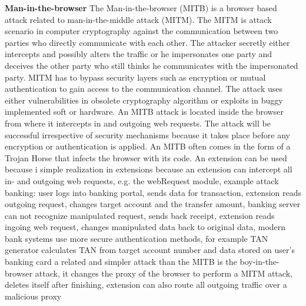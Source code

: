 \documentclass[article,colorback,accentcolor=tud9c,type=bsc]{tudthesis}
\begin{document}
	\textbf{Man-in-the-browser} \cite{Curran:2012:MBA:2433195.2433198} The Man-in-the-browser (MITB) is a browser based attack related to man-in-the-middle attack (MITM). The MITM is attack scenario in computer cryptography against the communication between two parties who directly communicate with each other. The attacker secretly either intercepts and possibly alters the traffic or he impersonates one party and deceives the other party who still thinks he communicates with the impersonated party. MITM has to bypass security layers such as encryption or mutual authentication to gain access to the communication channel. The attack uses either vulnerabilities in obsolete cryptography algorithm or exploits in buggy implemented soft or hardware. An MITB attack is located inside the browser from where it intercepts in and outgoing web requests. The attack will be successful irrespective of security mechanisms because it takes place before any encryption or authentication is applied. An MITB often comes in the form of a Trojan Horse that infects the browser with its code. An extension can be used because i %
	simple realization in extensions because an extension can intercept all in- and outgoing web requests, e.g. the webRequest module,   
	example attack banking: user logs into banking portal, sends data for transaction, extension reads outgoing request, changes target account and the transfer amount, banking server can not recognize manipulated request, sends back receipt, extension reads ingoing web request, changes manipulated data back to original data, modern bank systems use more secure authentication methods, for example TAN generator calculates TAN from target account number and data stored on user's banking card
	a related and simpler attack than the MITB is the boy-in-the-browser attack, it changes the proxy of the browser to perform a MITM attack, deletes itself after finishing, extension can also route all outgoing traffic over a malicious proxy 
	
\end{document}
